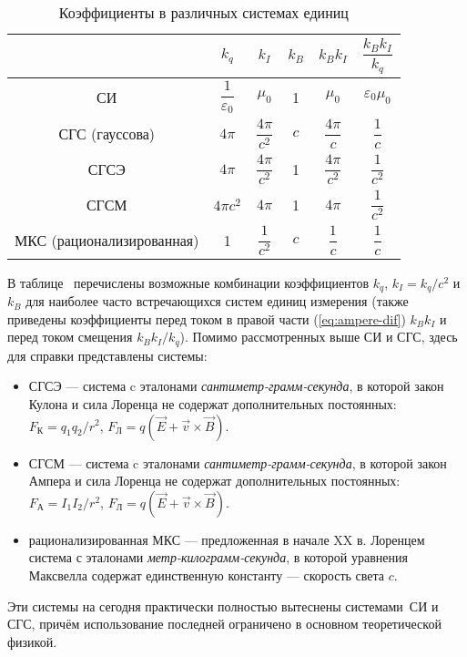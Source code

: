 \begin{table}[h!]
    \small
    \renewcommand{\arraystretch}{2}
    \centering
    \begin{tabular}{cccccc}
        \toprule
        & $k_{q}$ & $k_{I}$ & $k_{B}$ & $k_{B}k_{I}$
        & $\dfrac{k_{B}k_{I}}{k_{q}}$\\
        \midrule
        СИ & $\dfrac{1}{\varepsilon_{0}}$ & $\mu_{0}$ & 1 & $\mu_{0}$
        & $\varepsilon_{0}\mu_{0}$\\[1ex] \hline
        СГС (гауссова) & $4\pi$ & $\dfrac{4\pi}{c^{2}}$ & $c$ & $\dfrac{4\pi}{c}$ & $\dfrac{1}{c}$ \\[1ex] \hline
        СГСЭ & $4\pi$ & $\dfrac{4\pi}{c^{2}}$ & 1 & $\dfrac{4\pi}{c^{2}}$
        & $\dfrac{1}{c^{2}}$ \\[1ex] \hline
        СГСМ & $4\pi c^{2}$ & $4\pi$ & 1 & $4\pi$ & $\dfrac{1}{c^{2}}$ \\[1ex] \hline
        МКС (рационализированная) & 1 & $\dfrac{1}{c^{2}}$ & $c$ & $\dfrac{1}{c}$ & $\dfrac{1}{c}$\\
        \bottomrule
    \end{tabular}
    \caption{Коэффициенты в различных системах единиц}
\end{table}

В таблице~ перечислены возможные комбинации коэффициентов $k_{q}$, $k_{I}=k_{q}/c^{2}$
и $k_{B}$ для наиболее часто встречающихся систем единиц измерения
(также приведены коэффициенты перед током в правой части (\ref{eq:ampere-dif})
$k_{B}k_{I}$ и перед током смещения $k_{B}k_{I}/k_{q}$).
Помимо рассмотренных выше СИ и СГС, здесь для справки представлены системы:
\begin{itemize}
\item СГСЭ --- система c эталонами \emph{сантиметр-грамм-секунда},
    в которой закон Кулона и сила Лоренца не содержат дополнительных постоянных:
    $F_К = q_1q_2/r^2$, $F_Л = q(\vec{E} + \vec{v}\times \vec{B})$.
\item СГСМ --- система c эталонами \emph{сантиметр-грамм-секунда},
в которой закон Ампера и сила Лоренца не содержат дополнительных постоянных:
$F_А = I_1I_2/r^2$, $F_Л = q(\vec{E} + \vec{v}\times \vec{B})$.
\item рационализированная МКС --- предложенная в начале XX в. Лоренцем система
с эталонами \emph{метр-килограмм-секунда}, в которой уравнения
Максвелла содержат единственную константу --- скорость света $c$.
\end{itemize}
Эти системы на сегодня практически полностью вытеснены системами~СИ и
СГС, причём использование последней ограничено в основном
теоретической физикой.


